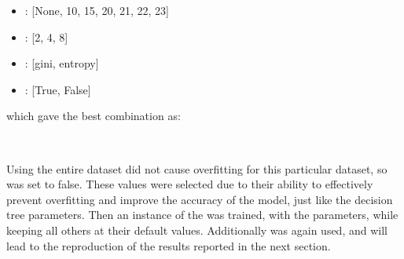 \begin{center}
    \begin{minipage}{4in}
\begin{itemize}
    \item {}: [None, 10, 15, 20, 21, 22, 23]
    \item {}: [2, 4, 8]
    \item {}: [gini, entropy]
    \item {}: [True, False] \\
\end{itemize}
            \end{minipage}
\end{center}

which gave the best combination as:\

\begin{tcolorbox}[colback=white,
                  arc=0pt,
                outer=0pt]
\centering {} \, \,  \, \,  \, \, \\
   \end{tcolorbox}


Using the entire dataset did not cause overfitting for this particular dataset, so  was set to false.
These values were selected due to their ability to effectively prevent overfitting and improve the accuracy of the model, just like the decision tree parameters.
Then an instance of the  was trained, with the parameters, while keeping all others at their default values.
Additionally  was again used, and will lead to the reproduction of the results reported in the next section.

